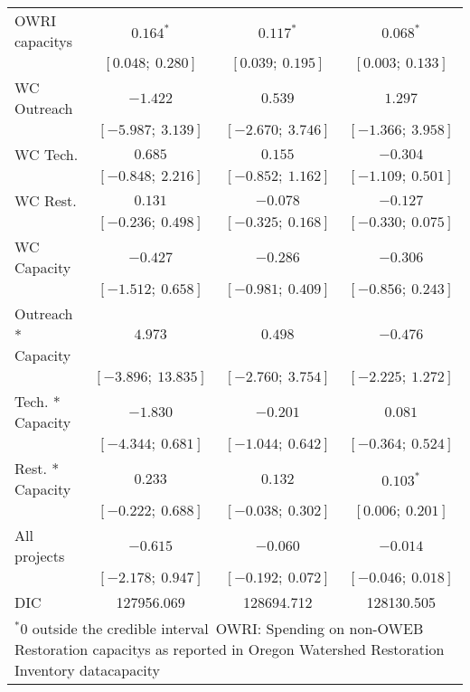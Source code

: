 \begin{table}
\begin{center}
\begin{tabular}{l c c c }
OWRI capacitys      & $0.164^{*}$         & $0.117^{*}$         & $0.068^{*}$         \\
                    & $[0.048;\ 0.280]$   & $[0.039;\ 0.195]$   & $[0.003;\ 0.133]$   \\
WC Outreach         & $-1.422$            & $0.539$             & $1.297$             \\
                    & $[-5.987;\ 3.139]$  & $[-2.670;\ 3.746]$  & $[-1.366;\ 3.958]$  \\
WC Tech.            & $0.685$             & $0.155$             & $-0.304$            \\
                    & $[-0.848;\ 2.216]$  & $[-0.852;\ 1.162]$  & $[-1.109;\ 0.501]$  \\
WC Rest.            & $0.131$             & $-0.078$            & $-0.127$            \\
                    & $[-0.236;\ 0.498]$  & $[-0.325;\ 0.168]$  & $[-0.330;\ 0.075]$  \\
WC Capacity         & $-0.427$            & $-0.286$            & $-0.306$            \\
                    & $[-1.512;\ 0.658]$  & $[-0.981;\ 0.409]$  & $[-0.856;\ 0.243]$  \\
Outreach * Capacity & $4.973$             & $0.498$             & $-0.476$            \\
                    & $[-3.896;\ 13.835]$ & $[-2.760;\ 3.754]$  & $[-2.225;\ 1.272]$  \\
Tech. * Capacity    & $-1.830$            & $-0.201$            & $0.081$             \\
                    & $[-4.344;\ 0.681]$  & $[-1.044;\ 0.642]$  & $[-0.364;\ 0.524]$  \\
Rest. * Capacity    & $0.233$             & $0.132$             & $0.103^{*}$         \\
                    & $[-0.222;\ 0.688]$  & $[-0.038;\ 0.302]$  & $[0.006;\ 0.201]$   \\
All projects        & $-0.615$            & $-0.060$            & $-0.014$            \\
                    & $[-2.178;\ 0.947]$  & $[-0.192;\ 0.072]$  & $[-0.046;\ 0.018]$  \\
\hline
DIC                 & 127956.069          & 128694.712          & 128130.505          \\
\hline
\multicolumn{4}{l}{\scriptsize{$^* 0$ outside the credible interval\
                           OWRI: Spending on non-OWEB Restoration capacitys as reported in Oregon Watershed Restoration Inventory datacapacity}}
\end{tabular}
\label{table:capacitymods}
\end{center}
\end{table}
